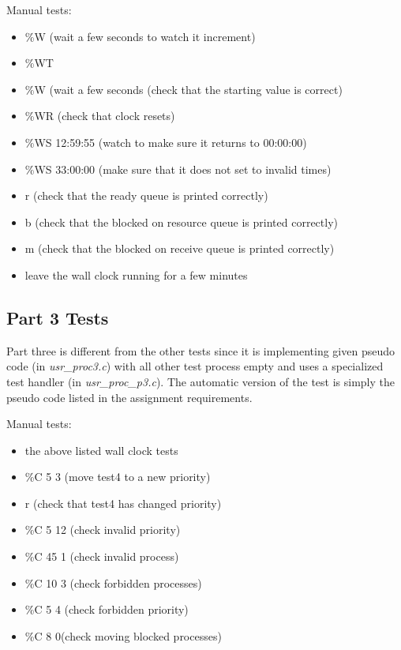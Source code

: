 \documentclass[11pt, oneside]{article}
\begin{document}
Manual tests:
\begin{itemize}
    \item \%W (wait a few seconds to watch it increment)
    \item \%WT
    \item \%W (wait a few seconds (check that the starting value is correct)
    \item \%WR (check that clock resets)
    \item \%WS 12:59:55 (watch to make sure it returns to 00:00:00)
    \item \%WS 33:00:00 (make sure that it does not set to invalid times)
    \item r (check that the ready queue is printed correctly)
    \item b (check that the blocked on resource queue is printed correctly)
    \item m (check that the blocked on receive queue is printed correctly)
    \item leave the wall clock running for a few minutes
\end{itemize}

\subsection{Part 3 Tests}
Part three is different from the other tests since it is implementing given pseudo code (in \textit{usr\_proc3.c}) with all other test process empty and uses a specialized test handler (in \textit{usr\_proc\_p3.c}). The automatic version of the test is simply the pseudo code listed in the assignment requirements.

Manual tests:
\begin{itemize}
     \item the above listed wall clock tests
     \item \%C 5 3 (move test4 to a new priority)
     \item r (check that test4 has changed priority)
     \item \%C 5 12 (check invalid priority)
     \item \%C 45 1 (check invalid process)
     \item \%C 10 3 (check forbidden processes)
     \item \%C 5 4 (check forbidden priority)
     \item \%C 8 0(check moving blocked processes)
 \end{itemize}
\end{document}
